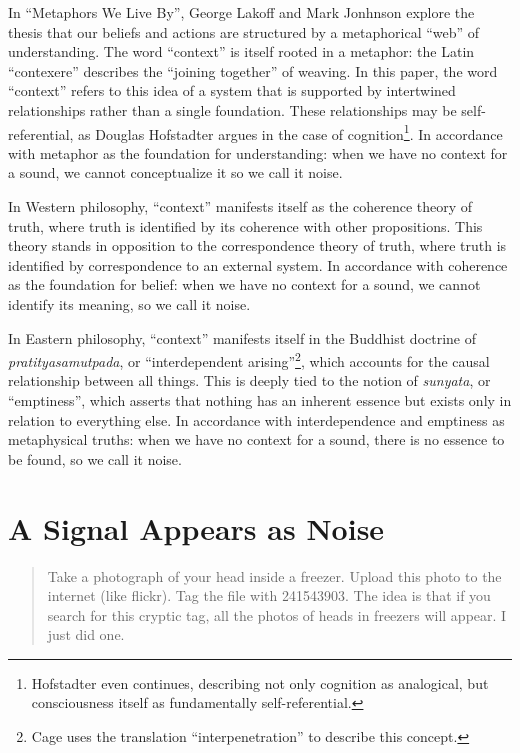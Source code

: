 \documentclass{thesis}
\begin{document}
In ``Metaphors We Live By'', George Lakoff and Mark Jonhnson explore the thesis that our beliefs and actions are structured by a metaphorical ``web'' of understanding. The word ``context'' is itself rooted in a metaphor: the Latin ``contexere'' describes the ``joining together'' of weaving. In this paper, the word ``context'' refers to this idea of a system that is supported by intertwined relationships rather than a single foundation. These relationships may be self-referential, as Douglas Hofstadter argues in the case of cognition\cite{Hofstadter01}\footnote{Hofstadter even continues, describing not only cognition as analogical, but consciousness itself as fundamentally self-referential\cite{Hofstadter07}.}. In accordance with metaphor as the foundation for understanding: when we have no context for a sound, we cannot conceptualize it so we call it noise.

In Western philosophy, ``context'' manifests itself as the coherence theory of truth\cite{Blackburn07}\cite{young_coherence_????}, where truth is identified by its coherence with other propositions. This theory stands in opposition to the correspondence\cite{david_correspondence_????} theory of truth, where truth is identified by correspondence to an external system. In accordance with coherence as the foundation for belief: when we have no context for a sound, we cannot identify its meaning, so we call it noise.

In Eastern philosophy, ``context'' manifests itself in the Buddhist doctrine of \emph{pratityasamutpada}, or ``interdependent arising''\footnote{Cage uses the translation ``interpenetration'' to describe this concept.}, which accounts for the causal relationship between all things.\cite{Koller01} This is deeply tied to the notion of \emph{sunyata}, or ``emptiness'', which asserts that nothing has an inherent essence but exists only in relation to everything else. In accordance with interdependence and emptiness as metaphysical truths: when we have no context for a sound, there is no essence to be found, so we call it noise.

\section{A Signal Appears as Noise}

\begin{quote}
Take a photograph of your head inside a freezer. Upload this photo to the internet (like flickr). Tag the file with 241543903. The idea is that if you search for this cryptic tag, all the photos of heads in freezers will appear. I just did one.
\end{quote}
\end{document}
